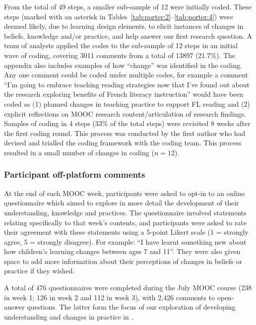 \documentclass[output=paper]{langscibook}
\begin{document}
From the total of 49 steps, a smaller sub-sample of 12 were initially coded. These steps (marked with an asterisk in Tables~\ref{tab:porter:2}--\ref{tab:porter:4}) were deemed likely, due to learning design elements, to elicit instances of changes in beliefs, knowledge and/or practice, and help answer our first research question. A team of analysts applied the codes \citep{TellierGraham2018} to the sub-sample of 12 steps in an initial wave of coding, covering 3011 comments from a total of 13897 (21.7\%). The appendix also includes examples of how ``change'' was identified in the coding. Any one comment could be coded under multiple codes, for example a comment ``I’m going to embrace teaching reading strategies now that I’ve found out about the research exploring benefits of French literacy instruction'' would have been coded as
(1) planned changes in teaching practice to support FL reading and
(2) explicit reflections on MOOC research content/articulation of research findings. Samples of coding in 4 steps (33\% of the total steps) were revisited 8 weeks after the first coding round. This process was conducted by the first author who had devised and trialled the coding framework with the coding team. This process resulted in a small number of changes in coding ($n = 12$).

\subsubsection{Participant off-platform comments}\label{sec:porter:2.3.2}

At the end of each MOOC week, participants were asked to opt-in to an online questionnaire which aimed to explore in more detail the development of their understanding, knowledge and practices. The questionnaire involved statements relating specifically to that week’s contents, and participants were asked to rate their agreement with these statements using a 5-point Likert scale (1 = strongly agree, 5 = strongly disagree). For example: ``I have learnt something new about how children’s learning changes between ages 7 and 11''.  They were also given space to add more information about their perceptions of changes in beliefs or practice if they wished.

A total of 476 questionnaires were completed during the July MOOC course (238 in week 1; 126 in week 2 and 112 in week 3), with 2,426 comments to open-answer questions. The latter form the focus of our exploration of developing understanding and changes in practice in .
\end{document}
